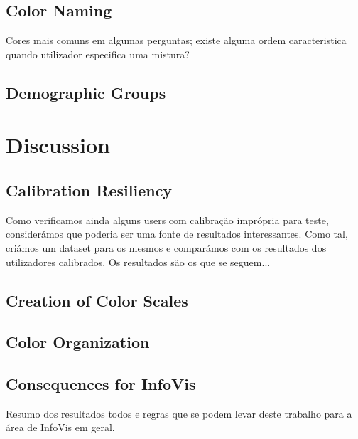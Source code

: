 \subsection{Color Naming}
\label{subsec:results_namingcolors}
%
Cores mais comuns em algumas perguntas; existe alguma ordem caracteristica quando utilizador especifica uma mistura?
%
\subsection{Demographic Groups}
\label{subsec:results_demographic}

\section{Discussion}
\label{sec:results_discussion}

\subsection{Calibration Resiliency}
\label{subsec:results_calibration}
%
Como verificamos ainda alguns users com calibração imprópria para teste, considerámos que poderia ser uma fonte de resultados
interessantes. Como tal, criámos um dataset para os mesmos e comparámos com os resultados dos utilizadores calibrados. Os resultados
são os que se seguem... \par
%
\subsection{Creation of Color Scales}
\label{subsec:results_discussion_colorscales}

\subsection{Color Organization}
\label{subsec:results_discussion_colororganization}

\subsection{Consequences for InfoVis}
\label{subsec:results_discussion_infovis}
%
Resumo dos resultados todos e regras que se podem levar deste trabalho para a área de InfoVis em geral.
%
